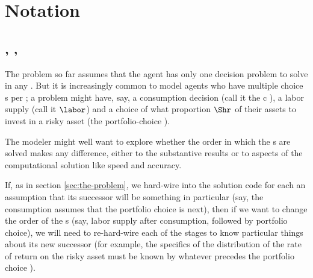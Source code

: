 \documentclass[titlepage, headings=optiontotocandhead]{econtex}
\begin{document}
\hypertarget{notation}{}
\section{Notation}\label{sec:notation}

\subsection{\Intervals, \Stgs, \Moves}

The problem so far assumes that the agent has only one decision problem to solve in any {\interval}.  But it is increasingly common to model agents who have multiple choice {\stg}s per {\interval}; a problem might have, say, a consumption decision (call it the $\mathrm{c}$ {\stg}), a labor supply {\stg} (call it $\labor$) and a choice of what proportion $\Shr$ of their assets to invest in a risky asset (the portfolio-choice {\stg}).

The modeler might well want to explore whether the order in which the {\stg}s are solved makes any difference, either to the substantive results or to aspects of the computational solution like speed and accuracy.

If, as in section \ref{sec:the-problem}, we hard-wire into the solution code for each {\stg} an assumption that its successor {\stg} will be something in particular (say, the consumption {\stg} assumes that the portfolio choice is next), then if we want to change the order of the {\stg}s (say, labor supply after consumption, followed by portfolio choice), we will need to re-hard-wire each of the stages to know particular things about its new successor (for example, the specifics of the distribution of the rate of return on the risky asset must be known by whatever {\stg} precedes the portfolio choice {\stg}).
\end{document}
